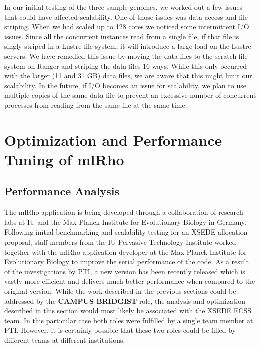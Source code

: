 \documentclass{sig-alternate}
\begin{document}
In our initial testing of the three sample genomes, we worked out a few issues that could have affected
scalability. One of those issues was data access and file striping. When we had scaled up to 128 cores we
noticed some intermittent I/O issues. Since all the concurrent instances read from a single file, if that file is
singly striped in a Lustre file system, it will introduce a large load on the Lustre servers. We have remedied
this issue by moving the data files to the scratch file system on Ranger and striping the data files 16
ways. While this only occurred with the larger (11 and 31 GB) data files, we are aware that this might limit
our scalability. In the future, if I/O becomes an issue for scalability, we plan to use multiple copies of the
same data file to prevent an excessive number of concurrent processes from reading from the same file at the
same time.

\section{Optimization and Performance Tuning of mlRho}\label{sec:optimization}
\subsection{Performance Analysis}\label{subsec:analysis}
The mlRho application is being developed through a collaboration of research labs at IU and the
Max Planck Institute for Evolutionary Biology in Germany. Following initial benchmarking and scalability
testing for an XSEDE allocation proposal, staff members from the IU Pervasive Technology Institute worked
together with the mlRho application developer at the Max Planck Institute for Evolutionary
Biology to improve the serial performance of the code. As a result of the investigations by PTI, a new version
has been recently released which is vastly more efficient and delivers much better performance when compared to
the original version. While the work described in the previous sections could be addressed by the {\bf CAMPUS
  BRIDGIST} role, the analysis and optimization described in this section would most likely be associated with
the XSEDE ECSS team. In this particular case both roles were fulfilled by a single team member at PTI. However,
it is certainly possible that these two roles could be filled by different teams at different institutions.
\end{document}
